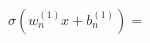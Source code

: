\documentclass[preview]{standalone}
\begin{document}
\begin{align*}
\sigma(w_n^{(1)}x+b_n^{(1)}) =
\end{align*}
\end{document}
